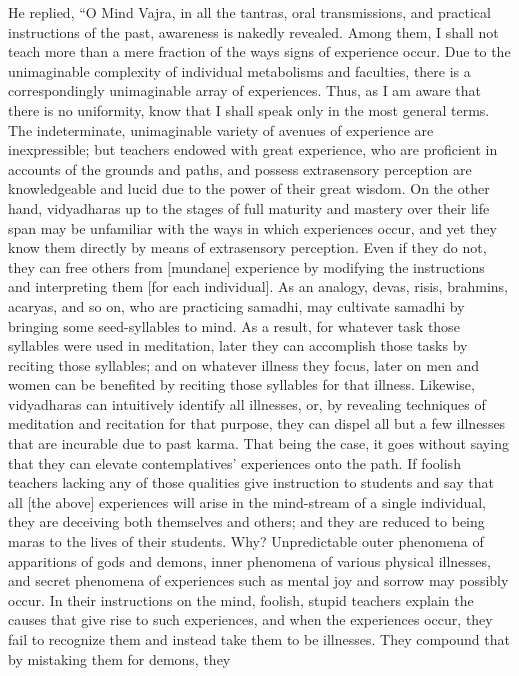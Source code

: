 \documentclass[a4paper,11pt,twoside,final]{book}
\begin{document}
He replied, ``O Mind Vajra, in all the tantras, oral transmissions,
and practical instructions of the past, awareness is nakedly
revealed. Among them, I shall not teach more than a mere fraction of
the ways signs of experience occur. Due to the unimaginable complexity
of individual metabolisms and faculties, there is a correspondingly
unimaginable array of experiences. Thus, as I am aware that there is
no uniformity, know that I shall speak only in the most general terms.
The indeterminate, unimaginable variety of avenues of experience are
inexpressible; but teachers endowed with great experience, who are
proficient in accounts of the grounds and paths, and possess
extrasensory perception are knowledgeable and lucid due to the power
of their great wisdom. On the other hand, vidyadharas up to the stages
of full maturity and mastery over their life span may be unfamiliar
with the ways in which experiences occur, and yet they know them
directly by means of extrasensory perception. Even if they do not,
they can free others from [mundane] experience by modifying the
instructions and interpreting them [for each individual].  As an
analogy, devas, risis, brahmins, acaryas, and so on, who are
practicing samadhi, may cultivate samadhi by bringing some
seed-syllables to mind. As a result, for whatever task those syllables
were used in meditation, later they can accomplish those tasks by
reciting those syllables; and on whatever illness they focus, later on
men and women can be benefited by reciting those syllables for that
illness. Likewise, vidyadharas can intuitively identify all illnesses,
or, by revealing techniques of meditation and recitation for that
purpose, they can dispel all but a few illnesses that are incurable
due to past karma. That being the case, it goes without saying that
they can elevate contemplatives' experiences onto the path.  If
foolish teachers lacking any of those qualities give instruction to
students and say that all [the above] experiences will arise in the
mind-stream of a single individual, they are deceiving both themselves
and others; and they are reduced to being maras to the lives of their
students. Why? Unpredictable outer phenomena of apparitions of gods
and demons, inner phenomena of various physical illnesses, and secret
phenomena of experiences such as mental joy and sorrow may possibly
occur. In their instructions on the mind, foolish, stupid teachers
explain the causes that give rise to such experiences, and when the
experiences occur, they fail to recognize them and instead take them
to be illnesses. They compound that by mistaking them for demons, they
\end{document}
